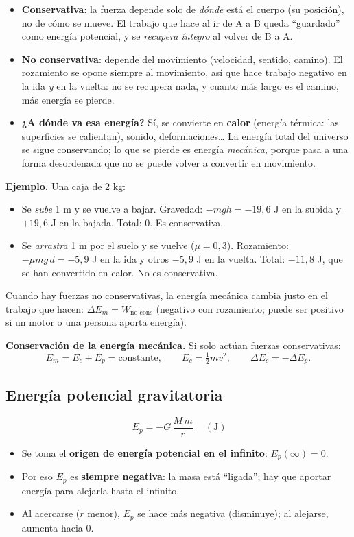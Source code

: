 \documentclass[11pt,a4paper]{article}
\begin{document}
\begin{clave}[title={¿Qué hace que una fuerza sea conservativa o no?}]
\begin{itemize}[itemsep=2pt]
  \item \textbf{Conservativa}: la fuerza depende solo de \emph{dónde} está el cuerpo (su posición), no de cómo se mueve. El trabajo que hace al ir de A a B queda ``guardado'' como energía potencial, y se \emph{recupera íntegro} al volver de B a A.
  \item \textbf{No conservativa}: depende del movimiento (velocidad, sentido, camino). El rozamiento se opone siempre al movimiento, así que hace trabajo negativo en la ida \emph{y} en la vuelta: no se recupera nada, y cuanto más largo es el camino, más energía se pierde.
  \item \textbf{¿A dónde va esa energía?} Sí, se convierte en \textbf{calor} (energía térmica: las superficies se calientan), sonido, deformaciones\ldots{} La energía total del universo se sigue conservando; lo que se pierde es energía \emph{mecánica}, porque pasa a una forma desordenada que no se puede volver a convertir en movimiento.
\end{itemize}
\textbf{Ejemplo.} Una caja de 2 kg:
\begin{itemize}[itemsep=1pt]
  \item Se \emph{sube} 1 m y se vuelve a bajar. Gravedad: $-mgh=-19{,}6$ J en la subida y $+19{,}6$ J en la bajada. Total: 0. Es conservativa.
  \item Se \emph{arrastra} 1 m por el suelo y se vuelve ($\mu=0{,}3$). Rozamiento: $-\mu mg\,d=-5{,}9$ J en la ida y otros $-5{,}9$ J en la vuelta. Total: $-11{,}8$ J, que se han convertido en calor. No es conservativa.
\end{itemize}
Cuando hay fuerzas no conservativas, la energía mecánica cambia justo en el trabajo que hacen: $\Delta E_m=W_{\text{no cons}}$ (negativo con rozamiento; puede ser positivo si un motor o una persona aporta energía).
\end{clave}

\textbf{Conservación de la energía mecánica.} Si solo actúan fuerzas conservativas:
\[
E_m=E_c+E_p=\text{constante},\qquad E_c=\tfrac12mv^2,\qquad \Delta E_c=-\Delta E_p .
\]

\subsection{Energía potencial gravitatoria}
\[
\boxed{\ E_p=-G\,\frac{M\,m}{r}\ }\quad(\mathrm J)
\]
\begin{itemize}[itemsep=2pt]
  \item Se toma el \textbf{origen de energía potencial en el infinito}: $E_p(\infty)=0$.
  \item Por eso $E_p$ es \textbf{siempre negativa}: la masa está ``ligada''; hay que aportar energía para alejarla hasta el infinito.
  \item Al acercarse ($r$ menor), $E_p$ se hace más negativa (disminuye); al alejarse, aumenta hacia 0.
\end{itemize}
\end{document}
